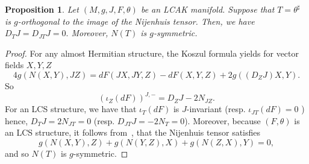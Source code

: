 \documentclass[a4paper,11pt]{amsart}
\newtheorem{prop}[thm]{Proposition}
\theoremstyle{definition}
\renewcommand{\[}{\begin{equation*}}
\renewcommand{\]}{\end{equation*}}
\begin{document}
 \begin{prop}\label{J-parallel-T}\cite[Proposition 2.1]{MR4698640}
Let $(M, g, J, F, \theta)$ be an LCAK manifold. Suppose that $T=\theta^\sharp$ is $g$-orthogonal to the image of the Nijenhuis tensor. Then, we have $D_TJ=D_{JT}J=0.$ Moreover, $N(T)$ is $g$-symmetric.
 \end{prop}
 \begin{proof}
 For any almost Hermitian structure, the Koszul formula yields for vector fields $X,Y,Z$
 \begin{equation*}
 4g(N(X,Y),JZ)=dF(JX,JY,Z)-dF(X,Y,Z)+2g((D_ZJ)X,Y).
 \end{equation*}
 So $$\left(\iota_Z(dF)\right)^{J,-}=D_ZJ-2N_{JZ}.$$
 For an LCS structure, we have that $\iota_T(dF)$ is $J$-invariant (resp. $\iota_{JT}(dF)=0$ ) hence, $D_TJ=2N_{JT}=0$ (resp. $D_{JT}J=-2N_{T}=0$).
 Moreover, because $(F,\theta)$ is an LCS structure, it follows from~\cite[Proposition 1]{MR1456265}, that the Nijenhuis tensor satisfies
 $$g(N(X,Y),Z)+g(N(Y,Z),X)+g(N(Z,X),Y)=0,$$
 and so $N(T)$ is $g$-symmetric.
 \end{proof}
\end{document}
